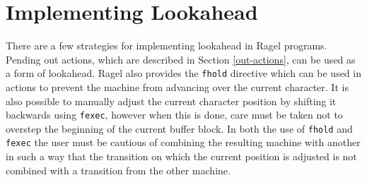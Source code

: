 \documentclass[letterpaper,11pt,oneside]{book}
\begin{document}
\section{Implementing Lookahead}

There are a few strategies for implementing lookahead in Ragel programs.
Pending out actions, which are described in Section \ref{out-actions}, can be
used as a form of lookahead.  Ragel also provides the \verb|fhold| directive
which can be used in actions to prevent the machine from advancing over the
current character. It is also possible to manually adjust the current character
position by shifting it backwards using \verb|fexec|, however when this is
done, care must be taken not to overstep the beginning of the current buffer
block. In both the use of \verb|fhold| and \verb|fexec| the user must be
cautious of combining the resulting machine with another in such a way that the
transition on which the current position is adjusted is not combined with a
transition from the other machine.
\end{document}
